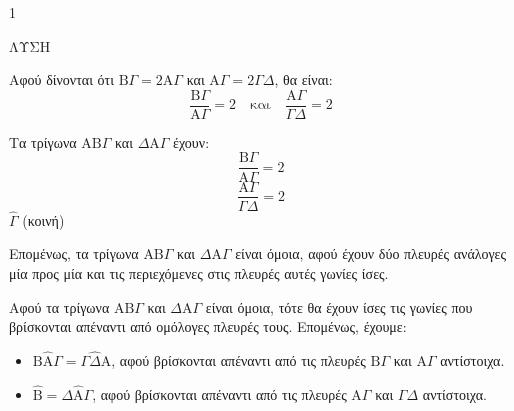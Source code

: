 \begin{ylh}{1}
    \item [Ομοιότητα τριγώνων]
\end{ylh}
\begin{figure} %
    \centering
\end{figure}

ΛΥΣΗ

\begin{alist}
    \item Αφού δίνονται ότι $\text{B}\Gamma = 2\text{A}\Gamma$ και $\text{A}\Gamma = 2\Gamma\Delta$, θα είναι:
    \[
        \frac{\text{B}\Gamma}{\text{A}\Gamma} = 2 \quad \text{και} \quad \frac{\text{A}\Gamma}{\Gamma\Delta} = 2
    \]

    \item Τα τρίγωνα $\text{AB}\Gamma$ και $\Delta\text{A}\Gamma$ έχουν:
    \[
        \frac{\text{B}\Gamma}{\text{A}\Gamma} = 2
    \]
    \[
        \frac{\text{A}\Gamma}{\Gamma\Delta} = 2
    \]
    $\hat{\Gamma}$ (κοινή)

    Επομένως, τα τρίγωνα $\text{AB}\Gamma$ και $\Delta\text{A}\Gamma$ είναι όμοια, αφού έχουν δύο πλευρές ανάλογες μία προς μία και τις περιεχόμενες στις πλευρές αυτές γωνίες ίσες.

    Αφού τα τρίγωνα $\text{AB}\Gamma$ και $\Delta\text{A}\Gamma$ είναι όμοια, τότε θα έχουν ίσες τις γωνίες που βρίσκονται απέναντι από ομόλογες πλευρές τους. Επομένως, έχουμε:
    \begin{itemize}
        \item $\text{B}\hat{\text{A}}\Gamma = \Gamma\hat{\Delta}\text{A}$, αφού βρίσκονται απέναντι από τις πλευρές $\text{B}\Gamma$ και $\text{A}\Gamma$ αντίστοιχα.
        \item $\hat{\text{B}} = \Delta\hat{\text{A}}\Gamma$, αφού βρίσκονται απέναντι από τις πλευρές $\text{A}\Gamma$ και $\Gamma\Delta$ αντίστοιχα.
    \end{itemize}
\end{alist}